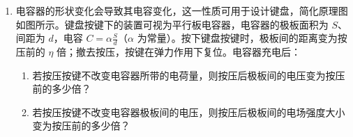 \documentclass[\gkver]{gaokaozhenti}
\begin{document}
\begin{enumerate}
{（2）根据线性元件与非线性元件的定义由图（a）可知，所测元件的伏安特性曲线不是直线，所以所测元件是非线性电阻元件。

根据 $R = \frac{U}{I}$，在伏安特性曲线上某点与原点连线的斜率的倒数表示电阻，随着电流的增加，曲线某点与原点连线的斜率逐渐增大，其倒数逐渐减小，所以元件的电阻减小。

（3）将电流表 A$_{1}$ 与 $R_{x}$ 并联，再与电流表 A$_{2}$、定值电阻 $R_{0}$ 串联接入电路。电路图如图所示


根据并联电路电压相等有 $I_{1}r_{1} = (I_{2} - I_{1})R_{x}$

可得 $R_{x} = \frac{I_{1}r_{1}}{I_{2} - I_{1}}$
}

\item
电容器的形状变化会导致其电容变化，这一性质可用于设计键盘，简化原理图如图所示。键盘按键下的装置可视为平行板电容器，电容器的极板面积为 $S$、间距为 $d$，电容 $C = \alpha \frac{S}{d}$（$\alpha$ 为常量）。按下键盘按键时，极板间的距离变为按压前的 $\eta$ 倍；撤去按压，按键在弹力作用下复位。电容器充电后：
\begin{enumerate}
	\item
	若按压按键不改变电容器所带的电荷量，则按压后极板间的电压变为按压前的多少倍？
	\item
	若按压按键不改变电容器极板间的电压，则按压后极板间的电场强度大小变为按压前的多少倍？
\end{enumerate}


\end{enumerate}
\end{document}
